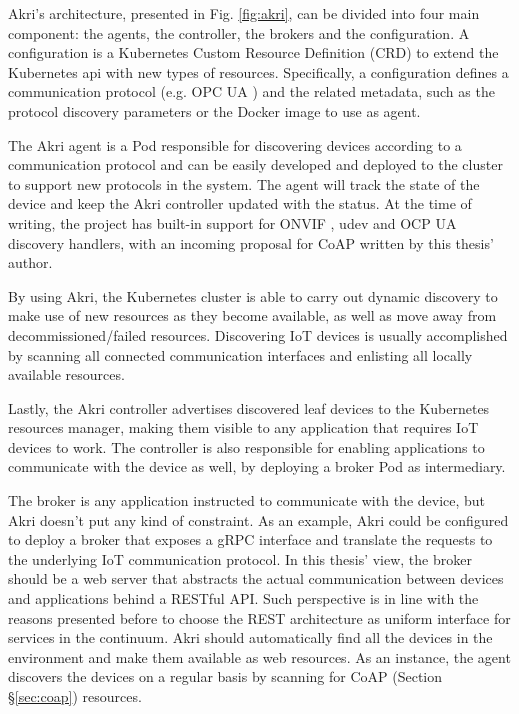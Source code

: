 Akri's architecture, presented in Fig. \ref{fig:akri}, can be divided into four main component: the agents, the controller, the brokers and the configuration. A configuration is a Kubernetes Custom Resource Definition (CRD) to extend the Kubernetes api with new types of resources. Specifically, a configuration defines a communication protocol (e.g. OPC UA \cite{rest-opc}) and the related metadata, such as the protocol discovery parameters or the Docker image to use as agent.

The Akri agent is a Pod responsible for discovering devices according to a communication protocol and can be easily developed and deployed to the cluster to support new protocols in the system. The agent will track the state of the device and keep the Akri controller updated with the status. At the time of writing, the project has built-in support for ONVIF \cite{onvif}, udev \cite{udev} and OCP UA \cite{rest-opc} discovery handlers, with an incoming proposal for CoAP \cite{coap} written by this thesis' author.

By using Akri, the Kubernetes cluster is able to carry out dynamic discovery to make use of new resources as they become available, as well as move away from decommissioned/failed resources. Discovering IoT devices is usually accomplished by scanning all connected communication interfaces and enlisting all locally available resources.

Lastly, the Akri controller advertises discovered leaf devices to the Kubernetes resources manager, making them visible to any application that requires IoT devices to work. The controller is also responsible for enabling applications to communicate with the device as well, by deploying a broker Pod as intermediary. 

The broker is any application instructed to communicate with the device, but Akri doesn't put any kind of constraint. As an example, Akri could be configured to deploy a broker that exposes a gRPC \cite{gRPC} interface and translate the requests to the underlying IoT communication protocol. In this thesis' view, the broker should be a web server that abstracts the actual communication between devices and applications behind a RESTful API. Such perspective is in line with the reasons presented before to choose the REST architecture as uniform interface for services in the continuum. Akri should automatically find all the devices in the environment and make them available as web resources. As an instance, the agent discovers the devices on a regular basis by scanning for CoAP (Section §\ref{sec:coap}) resources.

